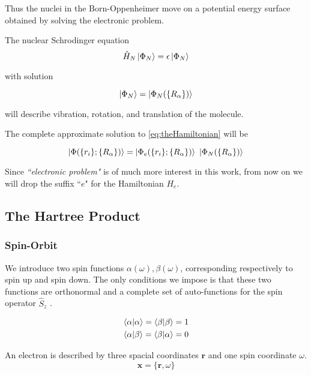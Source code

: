 \documentclass[a4paper,12pt]{article}
\begin{document}
Thus the nuclei in the Born-Oppenheimer move on a potential energy surface obtained by solving the electronic problem.

The nuclear Schrodinger equation  
\begin{equation}
	\hat{H}_{N} \ket{\Phi_{N}} = \epsilon \ket{\Phi_{N} }
\end{equation}

with solution 

\begin{equation}
	\ket{\Phi_{N}}=\ket{\Phi_{N}(\{R_{\alpha}\})}
\end{equation}

will describe vibration, rotation, and translation of the molecule.

The complete approximate solution to \eqref{eq:theHamiltonian} will be  \cite[p.43-45]{Attila}

\begin{equation}
	\ket{ \Phi(\{r_i\};\{R_{\alpha}\}) } 	= \ket{ \Phi_{e}(\{r_i\};\{R_{\alpha}\})} 
											~ \ket{ \Phi_{N}(\{R_{\alpha}\})}
\end{equation}

Since \textit{``electronic problem"} is of much more interest in this work, from now on we will drop the suffix ``$e$" for the Hamiltonian $H_{e}$.

\subsection{The Hartree Product}
\subsubsection{Spin-Orbit}
We introduce two spin functions  $\alpha(\omega), \beta(\omega)$, corresponding respectively to spin up and spin down.
The only conditions we impose is that these two functions are orthonormal and a complete set of auto-functions for the spin operator $\hat{S}_z$ .

\begin{align*}
	\bra{\alpha}\ket{\alpha} = \bra{\beta}\ket{\beta} = 1 \\
	\bra{\alpha}\ket{\beta} = \bra{\beta}\ket{\alpha} = 0
\end{align*}

An electron is described by three spacial coordinates $\mathbf{r}$ and one spin coordinate $\omega$.
\begin{equation}
	\mathbf{x} = \{\mathbf{r},\omega\}
\end{equation}
\end{document}
